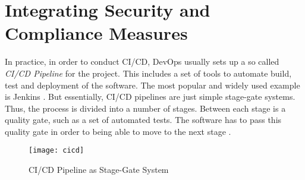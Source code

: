 \section{Integrating Security and Compliance Measures}
In practice, in order to conduct CI/CD, DevOps usually sets up a so called \emph{CI/CD Pipeline} for the project. This includes a set of tools to automate build, test and deployment of the software. The most popular and widely used example is Jenkins \cite{jenkins}. But essentially, CI/CD pipelines are just simple stage-gate systems. Thus, the process is divided into a number of stages. Between each stage is a quality gate, such as a set of automated tests. The software has to pass this quality gate in order to being able to move to the next stage \cite{StageGate}.

\begin{figure}[H]
	\centering
	\texttt{[image: cicd]}
	\caption[CI/CD Pipeline as Stage-Gate System]{CI/CD Pipeline as Stage-Gate System }
	\label{fig:CI/CD Pipeline}
\end{figure}

